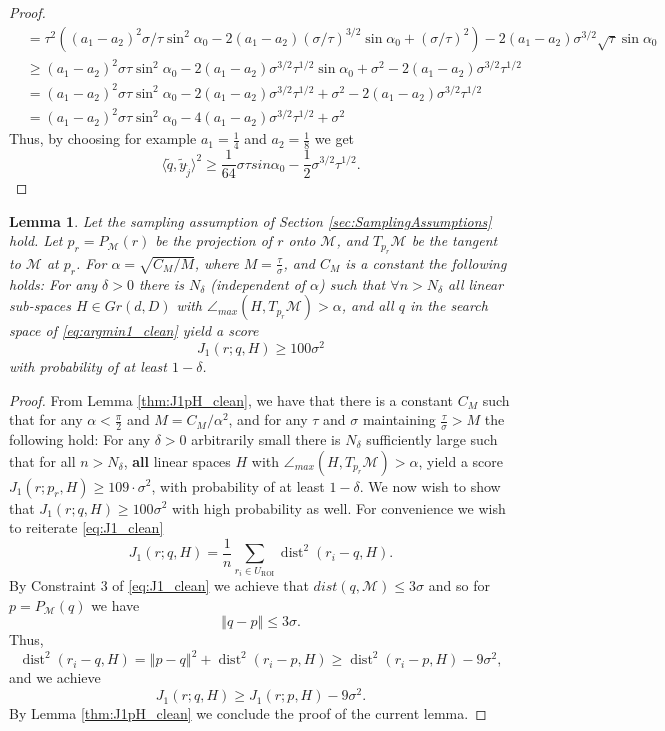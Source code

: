 \documentclass[12pt]{article}
\newtheorem{Lemma}[Theorem]{Lemma}
\theoremstyle{remark}
\newcommand{\MM}{\mathcal{M}}
\newcommand{\norm}[1]{\left\Vert #1 \right\Vert}
\newcommand{\dist}{\operatorname{dist}}
\newcommand{\lrangle}[1]{\langle #1 \rangle}
\begin{document}
\begin{proof}
\begin{align*}
    &= \tau^2 \left((a_1-a_2)^2{\sigma/\tau}\sin^2 \alpha_0 - 2(a_1-a_2)(\sigma/\tau)^{3/2}\sin\alpha_0 + (\sigma/\tau)^2\right) -2(a_1-a_2)\sigma^{3/2}\sqrt{\tau} \sin \alpha_0 \\
    &\geq (a_1-a_2)^2{\sigma\tau}\sin^2 \alpha_0 - 2(a_1-a_2)\sigma^{3/2}\tau^{1/2}\sin\alpha_0 + \sigma^2 -2(a_1-a_2)\sigma^{3/2}{\tau}^{1/2} \\
    &= (a_1-a_2)^2{\sigma\tau}\sin^2 \alpha_0 - 2(a_1-a_2)\sigma^{3/2}\tau^{1/2} + \sigma^2 -2(a_1-a_2)\sigma^{3/2}{\tau}^{1/2} \\
    &= (a_1-a_2)^2{\sigma\tau}\sin^2 \alpha_0 - 4(a_1-a_2)\sigma^{3/2}\tau^{1/2} + \sigma^2 
\end{align*}
Thus, by choosing for example $a_1 = \frac{1}{4}$ and $a_2 = \frac{1}{8}$ we get
\begin{equation}
    \lrangle{\tilde q, \tilde y_{\tilde j}}^2 \geq \frac{1}{64}\sigma \tau sin\alpha_0 - \frac{1}{2}\sigma^{3/2}\tau^{1/2}
.\end{equation}

\end{proof}


\begin{Lemma}\label{lem:J_1qH_clean}
Let the sampling assumption of Section \ref{sec:SamplingAssumptions} hold. Let ${p_r} = P_\MM(r)$ be the projection of $r$ onto $\MM$, and $ T_{p_r}\MM $ be the tangent to $ \MM $ at $ {p_r} $.
For $\alpha = \sqrt{C_M/M}$, where $M = \frac{\tau}{\sigma}$, and $C_M$ is a constant  the following holds:
For any $\delta >0$ there is $N_\delta$ (independent of $\alpha$) such that $\forall n > N_\delta$ all linear sub-spaces $H \in Gr(d,D)$ with $\angle_{max}(H,T_{{p_r}}\MM) > \alpha$, and all $q$ in the search space of \eqref{eq:argmin1_clean} yield a score 
\[
J_1(r; {q}, H) \geq 100\sigma^2 
\]
with probability of at least $1 - \delta$. 
\end{Lemma}
\begin{proof}
From Lemma \ref{thm:J1pH_clean}, we have that there is a constant $C_M$ such that for any $ {\alpha} < \frac{\pi}{2} $ and $M = C_M/\alpha^2$, and for any $\tau$ and $\sigma$ maintaining $\frac{\tau}{\sigma}>M$
    the following hold:
For any $\delta >0$ arbitrarily small there is $ N_\delta $ sufficiently large such that for all $ n>N_\delta $, \textbf{all} linear spaces $H$ with $\angle_{max}(H,T_{p_r}\MM) > \alpha$, yield a score $J_1(r; p_r, H) \geq 109 \cdot \sigma^2 $, with probability of at least $1 - \delta$. 
We now wish to show that $J_1(r; q, H) \geq 100 \sigma^2$ with high probability as well.
For convenience we wish to reiterate \eqref{eq:J1_clean}
\[
J_1(r; q, H) = \frac{1}{n}\sum_{r_i\in U_{\textrm{ROI}}} \dist^2 (r_i - q,H)
.\]
By Constraint 3 of \eqref{eq:J1_clean} we achieve that $dist(q, \MM) \leq 3\sigma$ and so for $p=P_\MM(q)$ we have
\[
\norm{q - p} \leq 3\sigma
.\]
Thus,
\[
\dist^2 (r_i - q,H) = \norm{p - q}^2 + \dist^2 (r_i - p,H) \geq \dist^2 (r_i - p,H) - 9\sigma^2
,\]
and we achieve
\[
J_1(r; q, H) \geq J_1(r; p, H) - 9\sigma^2
.\]
By Lemma \ref{thm:J1pH_clean} we conclude the proof of the current lemma.
\end{proof}
\end{document}
